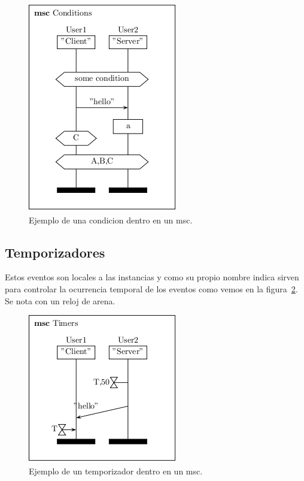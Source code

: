 \begin{figure}
  \centering
  \includegraphics[scale=1]{./images/condition.png}
  \caption{Ejemplo de una condicion dentro en un msc.}
  \label{fig:condition}
\end{figure}

\subsection*{Temporizadores}
Estos eventos son locales a las instancias y como su propio nombre
indica sirven para controlar la ocurrencia temporal de los eventos
como vemos en la figura~\ref{fig:timer}. Se
nota con un reloj de arena.

\begin{figure}
  \centering
  \includegraphics[scale=1]{./images/timer.png}
  \caption{Ejemplo de un temporizador dentro en un msc.}
  \label{fig:timer}
\end{figure}

